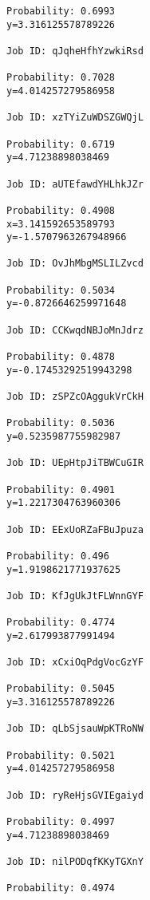 \documentclass[11pt]{article}
\begin{document}
\begin{Verbatim}[commandchars=\\\{\}]
Probability: 0.6993
y=3.316125578789226

Job ID: qJqheHfhYzwkiRsd

Probability: 0.7028
y=4.014257279586958

Job ID: xzTYiZuWDSZGWQjL

Probability: 0.6719
y=4.71238898038469

Job ID: aUTEfawdYHLhkJZr

Probability: 0.4908
x=3.141592653589793
y=-1.5707963267948966

Job ID: OvJhMbgMSLILZvcd

Probability: 0.5034
y=-0.8726646259971648

Job ID: CCKwqdNBJoMnJdrz

Probability: 0.4878
y=-0.17453292519943298

Job ID: zSPZcOAggukVrCkH

Probability: 0.5036
y=0.5235987755982987

Job ID: UEpHtpJiTBWCuGIR

Probability: 0.4901
y=1.2217304763960306

Job ID: EExUoRZaFBuJpuza

Probability: 0.496
y=1.9198621771937625

Job ID: KfJgUkJtFLWnnGYF

Probability: 0.4774
y=2.617993877991494

Job ID: xCxiOqPdgVocGzYF

Probability: 0.5045
y=3.316125578789226

Job ID: qLbSjsauWpKTRoNW

Probability: 0.5021
y=4.014257279586958

Job ID: ryReHjsGVIEgaiyd

Probability: 0.4997
y=4.71238898038469

Job ID: nilPODqfKKyTGXnY

Probability: 0.4974

    \end{Verbatim}
\end{document}
